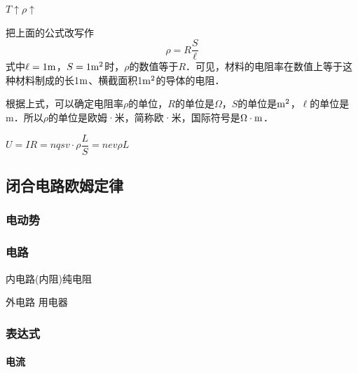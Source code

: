 \documentclass[10pt,cn]{elegantbook}
\begin{document}
      $T\uparrow \rho \uparrow$
      
      把上面的公式改写作
      \[\rho=R\frac{S}{\ell}\]
      式中$\ell=1{\rm m}$，$S=1{\rm m^2}$时，$\rho$的数值等于$R$．可见，材料的电阻率在数值上等于这种材料制成的长1${\rm m}$、横截面积1${\rm m}^2$的导体的电阻．
      
      根据上式，可以确定电阻率$\rho$的单位，$R$的单位是$\Omega$，$S$的单位是${\rm m^2}$，$\ell$的单位是m．所以$\rho$的单位是欧姆·米，简称欧·米，国际符号是$\Omega\cdot {\rm m}$．
      
      $U=IR=nqsv\cdot \rho \dfrac{L}{S}=nev\rho L$
      
         \begin{center}
      \end{center}
\subsection{闭合电路欧姆定律}

\subsubsection{电动势}
\subsubsection{电路}

内电路(内阻)纯电阻

外电路 用电器

\subsubsection{表达式}

\paragraph*{电流}

\begin{center}
\end{center}
\end{document}
